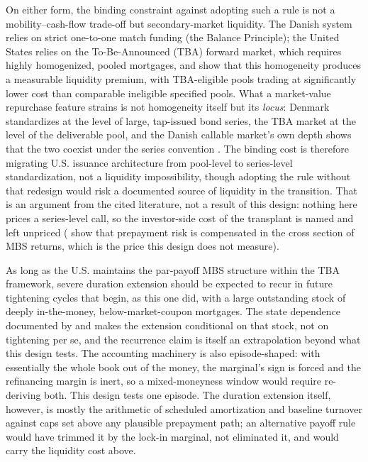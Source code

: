 On either form, the binding constraint against adopting such a rule is not a mobility--cash-flow trade-off but secondary-market liquidity. The Danish system relies on strict one-to-one match funding (the Balance Principle); the United States relies on the To-Be-Announced (TBA) forward market, which requires highly homogenized, pooled mortgages, and \citet{vickery2013} show that this homogeneity produces a measurable liquidity premium, with TBA-eligible pools trading at significantly lower cost than comparable ineligible specified pools. What a market-value repurchase feature strains is not homogeneity itself but its \emph{locus}: Denmark standardizes at the level of large, tap-issued bond series, the TBA market at the level of the deliverable pool, and the Danish callable market's own depth shows that the two coexist under the series convention \citep{berg2018}. The binding cost is therefore migrating U.S. issuance architecture from pool-level to series-level standardization, not a liquidity impossibility, though adopting the rule without that redesign would risk a documented source of liquidity in the transition. That is an argument from the cited literature, not a result of this design: nothing here prices a series-level call, so the investor-side cost of the transplant is named and left unpriced (\citet{diep2021} show that prepayment risk is compensated in the cross section of MBS returns, which is the price this design does not measure).

As long as the U.S. maintains the par-payoff MBS structure within the TBA framework, severe duration extension should be expected to recur in future tightening cycles that begin, as this one did, with a large outstanding stock of deeply in-the-money, below-market-coupon mortgages. The state dependence documented by \citet{berger2021} and \citet{eichenbaum2022} makes the extension conditional on that stock, not on tightening per se, and the recurrence claim is itself an extrapolation beyond what this design tests. The accounting machinery is also episode-shaped: with essentially the whole book out of the money, the marginal's sign is forced and the refinancing margin is inert, so a mixed-moneyness window would require re-deriving both. This design tests one episode. The duration extension itself, however, is mostly the arithmetic of scheduled amortization and baseline turnover against caps set above any plausible prepayment path; an alternative payoff rule would have trimmed it by the lock-in marginal, not eliminated it, and would carry the liquidity cost above.

